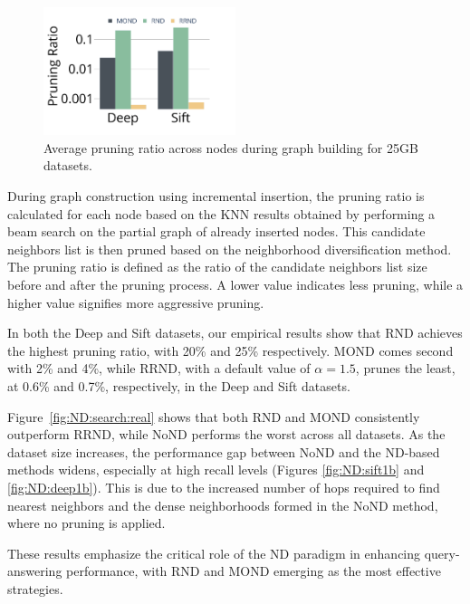\begin{figure}[h]
    \centering
    \captionsetup{justification=centering}
    \includegraphics[width=0.5\textwidth]{../img/Experiments/RNG/pruningratio_n.pdf}
    \caption{Average pruning ratio across nodes during graph building for 25GB datasets.}
    \label{fig:pruning_ratio}
\end{figure}

During graph construction using incremental insertion, the pruning ratio is calculated for each node based on the KNN results obtained by performing a beam search on the partial graph of already inserted nodes. This candidate neighbors list is then pruned based on the neighborhood diversification method. The pruning ratio is defined as the ratio of the candidate neighbors list size before and after the pruning process. A lower value indicates less pruning, while a higher value signifies more aggressive pruning.

In both the Deep and Sift datasets, our empirical results show that RND achieves the highest pruning ratio, with 20\% and 25\% respectively. MOND comes second with 2\% and 4\%, while RRND, with a default value of \(\alpha = 1.5\), prunes the least, at 0.6\% and 0.7\%, respectively, in the Deep and Sift datasets.

Figure~\ref{fig:ND:search:real} shows that both RND and MOND consistently outperform RRND, while NoND performs the worst across all datasets. As the dataset size increases, the performance gap between NoND and the ND-based methods widens, especially at high recall levels (Figures \ref{fig:ND:sift1b} and \ref{fig:ND:deep1b}). This is due to the increased number of hops required to find nearest neighbors and the dense neighborhoods formed in the NoND method, where no pruning is applied.

These results emphasize the critical role of the ND paradigm in enhancing query-answering performance, with RND and MOND emerging as the most effective strategies.

